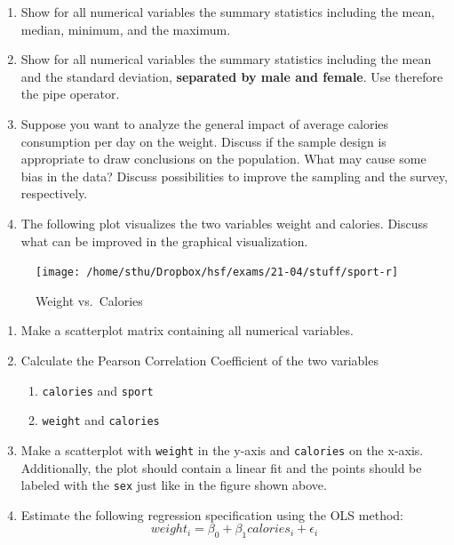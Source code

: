 \documentclass[
  12pt,
  oneside]{book}
\providecommand{\tightlist}{%
  \setlength{\itemsep}{0pt}\setlength{\parskip}{0pt}}
\begin{document}
\begin{enumerate}
\def\labelenumi{\alph{enumi})}
\setcounter{enumi}{6}
\item
  Show for all numerical variables the summary statistics including the mean, median, minimum, and the maximum.
\item
  Show for all numerical variables the summary statistics including the mean and the standard deviation, \textbf{separated by male and female}. Use therefore the pipe operator.
\item
  Suppose you want to analyze the general impact of average calories consumption per day on the weight. Discuss if the sample design is appropriate to draw conclusions on the population. What may cause some bias in the data? Discuss possibilities to improve the sampling and the survey, respectively.
\item
  The following plot visualizes the two variables weight and calories. Discuss what can be improved in the graphical visualization.
\end{enumerate}

\begin{figure}
\centering
\texttt{[image: /home/sthu/Dropbox/hsf/exams/21-04/stuff/sport-r]}
\caption{Weight vs.~Calories}
\end{figure}

\begin{enumerate}
\def\labelenumi{\alph{enumi})}
\setcounter{enumi}{10}
\item
  Make a scatterplot matrix containing all numerical variables.
\item
  Calculate the Pearson Correlation Coefficient of the two variables

  \begin{enumerate}
  \def\labelenumii{\arabic{enumii}.}
  \tightlist
  \item
    \texttt{calories} and \texttt{sport}
  \item
    \texttt{weight} and \texttt{calories}
  \end{enumerate}
\item
  Make a scatterplot with \texttt{weight} in the y-axis and \texttt{calories} on the x-axis. Additionally, the plot should contain a linear fit and the points should be labeled with the \texttt{sex} just like in the figure shown above.
\item
  Estimate the following regression specification using the OLS method:
  \[weight_i=\beta_0+\beta_1 calories_i+ \epsilon_i\]
\end{enumerate}
\end{document}
